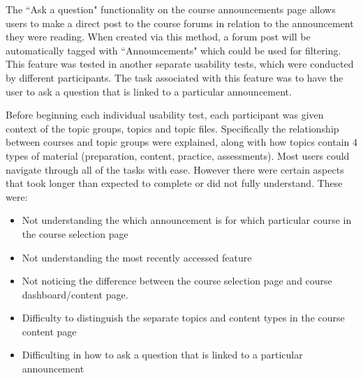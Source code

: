 The ``Ask a question" functionality on the course announcements page allows users to make a direct post to the course forums in relation to the announcement they were reading.
When created via this method, a forum post will be automatically tagged with ``Announcements" which could be used for filtering.
This feature was tested in another separate usability tests, which were conducted by different participants.
The task associated with this feature was to have the user to ask a question that is linked to a particular announcement.

Before beginning each individual usability test, each participant was given context of the topic groups, topics and topic files. Specifically the relationship between courses and topic groups were explained, along with how topics contain 4 types of material (preparation, content, practice, assessments).
Most users could navigate through all of the tasks with ease. However there were certain aspects that took longer than expected to complete or did not fully understand.
These were:
\begin{itemize}
    \item Not understanding the which announcement is for which particular course in the course selection page
    \item Not understanding the most recently accessed feature
    \item Not noticing the difference between the course selection page and course dashboard/content page.
    \item Difficulty to distinguish the separate topics and content types in the course content page
    \item Difficulting in how to ask a question that is linked to a particular announcement
\end{itemize}


